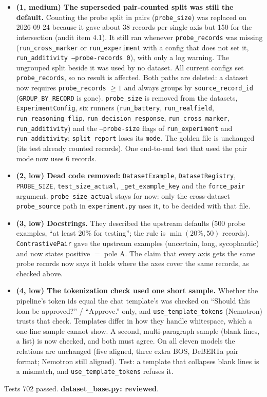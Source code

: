 \documentclass{article}
\begin{document}
\begin{itemize}
  \item \textbf{(1, medium) The superseded pair-counted split was still the default.} Counting the probe split in
        pairs (\texttt{probe\_size}) was replaced on 2026-09-24 because it gave about 38 records per single axis
        but 150 for the intersection (audit item 4.1). It still ran whenever \texttt{probe\_records} was missing
        (\texttt{run\_cross\_marker} or \texttt{run\_experiment} with a config that does not set it,
        \texttt{run\_additivity --probe-records 0}), with only a log warning. The ungrouped split beside it was
        used by no dataset. All current configs set \texttt{probe\_records}, so no result is affected. Both paths
        are deleted: a dataset now requires \texttt{probe\_records} $\geq 1$ and always groups by
        \texttt{source\_record\_id} (\texttt{GROUP\_BY\_RECORD} is gone). \texttt{probe\_size} is removed from the
        datasets, \texttt{ExperimentConfig}, six runners (\texttt{run\_battery}, \texttt{run\_realfield},
        \texttt{run\_reasoning\_flip}, \texttt{run\_decision\_response}, \texttt{run\_cross\_marker},
        \texttt{run\_additivity}) and the \texttt{--probe-size} flags of \texttt{run\_experiment} and
        \texttt{run\_additivity}; \texttt{split\_report} loses its \texttt{mode}. The golden file is unchanged
        (its test already counted records). One end-to-end test that used the pair mode now uses 6 records.
  \item \textbf{(2, low) Dead code removed:} \texttt{DatasetExample}, \texttt{DatasetRegistry},
        \texttt{PROBE\_SIZE}, \texttt{test\_size\_actual}, \texttt{\_get\_example\_key} and the
        \texttt{force\_pair} argument. \texttt{probe\_size\_actual} stays for now: only the cross-dataset
        \texttt{probe\_source} path in \texttt{experiment.py} uses it, to be decided with that file.
  \item \textbf{(3, low) Docstrings.} They described the upstream defaults (500 probe examples, ``at least 20\%
        for testing''; the rule is $\min(20\%, 50)$ records). \texttt{ContrastivePair} gave the upstream
        examples (uncertain, long, sycophantic) and now states positive $=$ pole A. The claim that every axis gets
        the same probe records now says it holds where the axes cover the same records, as checked above.
  \item \textbf{(4, low) The tokenization check used one short sample.} Whether the pipeline's token ids equal the
        chat template's was checked on ``Should this loan be approved?'' / ``Approve.'' only, and
        \texttt{use\_template\_tokens} (Nemotron) trusts that check. Templates differ in how they handle
        whitespace, which a one-line sample cannot show. A second, multi-paragraph sample (blank lines, a list) is
        now checked, and both must agree. On all eleven models the relations are unchanged (five aligned, three
        extra BOS, DeBERTa pair format; Nemotron still aligned). Test: a template that collapses blank lines is a
        mismatch, and \texttt{use\_template\_tokens} refuses it.
\end{itemize}
Tests 702 passed. \textbf{dataset\_base.py: reviewed}.
\end{document}
